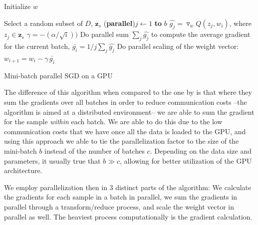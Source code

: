 \documentclass[11pt,a4paper]{article}
\begin{document}
\begin{algorithm}
	\DontPrintSemicolon %
	Initialize $w$\;
	 {
		Select a random subset of $D$, $\mathbf{z}_s$\;
		\For(\textbf{parallel}){$j \gets 1$ \textbf{to} $b$} {
			$\hat{g_j} = \triangledown_w Q(z_j, w_i)$, where $z_j \in \mathbf{z}_s$\;
		}
		$\gamma = -(\alpha / \sqrt{i}))$\;
		Do parallel sum $\sum_j{\hat{g_j}}$ to compute the average gradient for the current batch, $\bar{g_i} = 1/j \sum_j{\hat{g_j}}$\;
		Do parallel scaling of the weight vector: $w_{i + 1} = w_i - \gamma \,  \bar{g_i}$\;
		
	}
	\;
	\caption{Mini-batch parallel SGD on a GPU}
	\label{algo:sgd-gpu}
\end{algorithm}

The difference of this algorithm when compared to the one by \cite{dekel2012optimal} is that where they sum
the gradients over all batches in order to reduce communication costs --the algorithm is aimed at a distributed environment--
we are able to sum the gradient for the sample \textit{within} each batch. We are able to do this due to the low communication
costs that we have once all the data is loaded to the GPU, and using this approach we able to tie the parallelization factor
to the size of the mini-batch $b$ instead of the number of batches $c$. Depending on the data size and parameters,
it usually true that $b \gg c$, allowing for better utilization of the GPU architecture.

We employ parallelization then in 3 distinct parts of the algorithm: We calculate the gradients for each sample in a batch in
parallel, we sum the gradients in parallel through a transform/reduce process, and scale the weight vector in parallel as well.
The heaviest process computationally is the gradient calculation.




\end{document}
